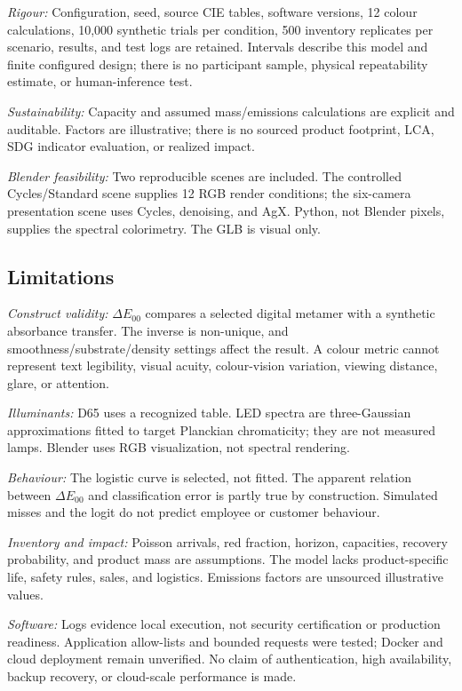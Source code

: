 \documentclass[journal]{IEEEtran}
\newcommand{\dE}{\ensuremath{\Delta E_{00}}}
\begin{document}
\textit{Rigour:} Configuration, seed, source CIE tables, software versions, 12 colour calculations, 10,000 synthetic trials per condition, 500 inventory replicates per scenario, results, and test logs are retained. Intervals describe this model and finite configured design; there is no participant sample, physical repeatability estimate, or human-inference test.

\textit{Sustainability:} Capacity and assumed mass/emissions calculations are explicit and auditable. Factors are illustrative; there is no sourced product footprint, LCA, SDG indicator evaluation, or realized impact.

\textit{Blender feasibility:} Two reproducible scenes are included. The controlled Cycles/Standard scene supplies 12 RGB render conditions; the six-camera presentation scene uses Cycles, denoising, and AgX. Python, not Blender pixels, supplies the spectral colorimetry. The GLB is visual only.

\subsection{Limitations}
\textit{Construct validity:} \dE{} compares a selected digital metamer with a synthetic absorbance transfer. The inverse is non-unique, and smoothness/substrate/density settings affect the result. A colour metric cannot represent text legibility, visual acuity, colour-vision variation, viewing distance, glare, or attention.

\textit{Illuminants:} D65 uses a recognized table. LED spectra are three-Gaussian approximations fitted to target Planckian chromaticity; they are not measured lamps. Blender uses RGB visualization, not spectral rendering.

\textit{Behaviour:} The logistic curve is selected, not fitted. The apparent relation between \dE{} and classification error is partly true by construction. Simulated misses and the logit do not predict employee or customer behaviour.

\textit{Inventory and impact:} Poisson arrivals, red fraction, horizon, capacities, recovery probability, and product mass are assumptions. The model lacks product-specific life, safety rules, sales, and logistics. Emissions factors are unsourced illustrative values.

\textit{Software:} Logs evidence local execution, not security certification or production readiness. Application allow-lists and bounded requests were tested; Docker and cloud deployment remain unverified. No claim of authentication, high availability, backup recovery, or cloud-scale performance is made.
\end{document}
